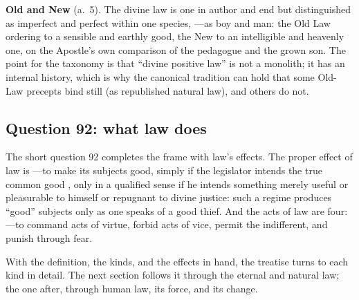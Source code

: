 \textbf{Old and New} (a.~5). The divine law is one in author and end but distinguished as imperfect and perfect within one species, ---as boy and man: the Old Law ordering to a sensible and earthly good, the New to an intelligible and heavenly one, on the Apostle's own comparison of the pedagogue and the grown son. The point for the taxonomy is that ``divine positive law'' is not a monolith; it has an internal history, which is why the canonical tradition can hold that some Old-Law precepts bind still (as republished natural law), and others do not.

\subsection{Question 92: what law does}

The short question 92 completes the frame with law's effects. The proper effect of law is ---to make its subjects good, simply if the legislator intends the true common good , only in a qualified sense if he intends something merely useful or pleasurable to himself or repugnant to divine justice: such a regime produces ``good'' subjects only as one speaks of a good thief. And the acts of law are four: ---to command acts of virtue, forbid acts of vice, permit the indifferent, and punish through fear.

With the definition, the kinds, and the effects in hand, the treatise turns to each kind in detail. The next section follows it through the eternal and natural law; the one after, through human law, its force, and its change.
